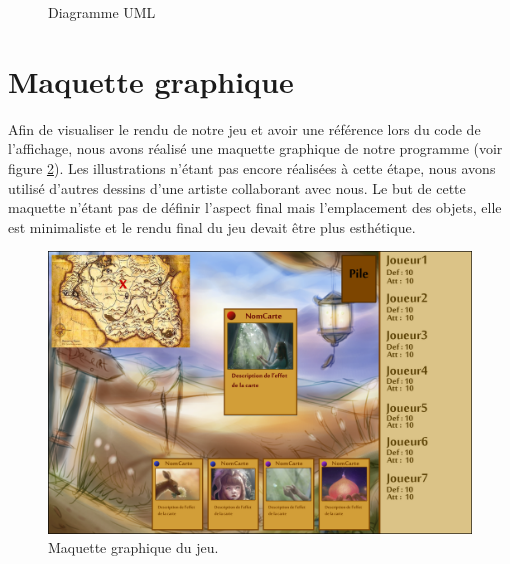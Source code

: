 \documentclass[12pt]{report}
\begin{document}
	\begin{figure}
		\caption{Diagramme UML}
		\label{fig:UML}
	\end{figure}

  \section{Maquette graphique}
  Afin de visualiser le rendu de notre jeu et avoir une référence lors du code de l'affichage, nous avons réalisé une maquette graphique de notre programme (voir figure \ref{fig:maquette}). Les illustrations n'étant pas encore réalisées à cette étape, nous avons utilisé d'autres dessins d'une artiste collaborant avec nous. Le but de cette maquette n'étant pas de définir l'aspect final mais l'emplacement des objets, elle est minimaliste et le rendu final du jeu devait être plus esthétique.\\[1.5cm]

  \begin{figure}[h!]
  	\centering
    \includegraphics[scale=2.8]{mock-up.png}
    \caption{Maquette graphique du jeu.}
    \label{fig:maquette}
  \end{figure}
\end{document}
